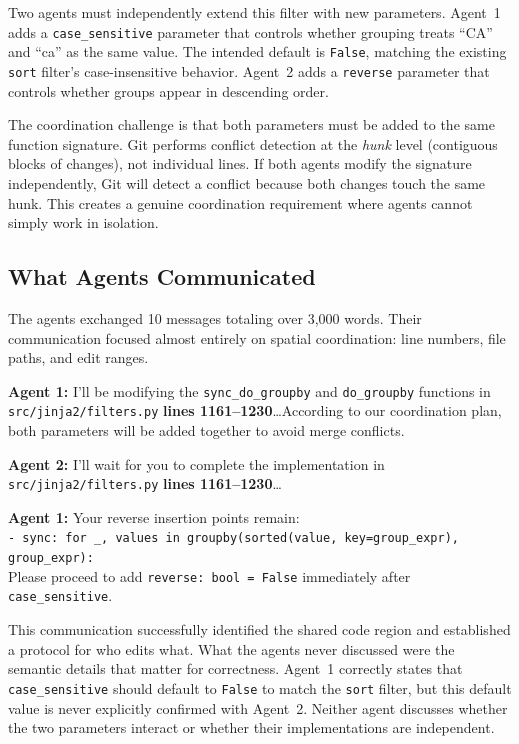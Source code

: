 Two agents must independently extend this filter with new parameters. Agent~1 adds a \texttt{case\_sensitive} parameter that controls whether grouping treats ``CA'' and ``ca'' as the same value. The intended default is \texttt{False}, matching the existing \texttt{sort} filter's case-insensitive behavior. Agent~2 adds a \texttt{reverse} parameter that controls whether groups appear in descending order.

The coordination challenge is that both parameters must be added to the same function signature. Git performs conflict detection at the \emph{hunk} level (contiguous blocks of changes), not individual lines. If both agents modify the signature independently, Git will detect a conflict because both changes touch the same hunk. This creates a genuine coordination requirement where agents cannot simply work in isolation.

\subsection{What Agents Communicated}

The agents exchanged 10 messages totaling over 3,000 words. Their communication focused almost entirely on spatial coordination: line numbers, file paths, and edit ranges.

\begin{tcolorbox}[symptomcard]
\small
\textbf{Agent 1:} I'll be modifying the \texttt{sync\_do\_groupby} and \texttt{do\_groupby} functions in \texttt{src/jinja2/filters.py} \textbf{lines 1161--1230}\ldots According to our coordination plan, both parameters will be added together to avoid merge conflicts.

\medskip

\textbf{Agent 2:} I'll wait for you to complete the implementation in \texttt{src/jinja2/filters.py} \textbf{lines 1161--1230}\ldots

\medskip

\textbf{Agent 1:} Your reverse insertion points remain:\\
\texttt{- sync: for \_, values in groupby(sorted(value, key=group\_expr), group\_expr):}\\
Please proceed to add \texttt{reverse: bool = False} immediately after \texttt{case\_sensitive}.
\end{tcolorbox}

This communication successfully identified the shared code region and established a protocol for who edits what. What the agents never discussed were the semantic details that matter for correctness. Agent~1 correctly states that \texttt{case\_sensitive} should default to \texttt{False} to match the \texttt{sort} filter, but this default value is never explicitly confirmed with Agent~2. Neither agent discusses whether the two parameters interact or whether their implementations are independent.

